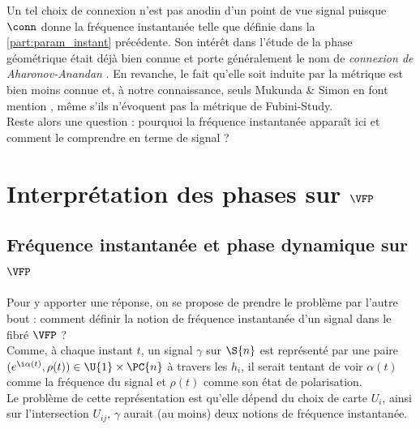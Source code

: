 Un tel choix de connexion n'est pas anodin d'un point de vue signal puisque $\conn$ donne la fréquence instantanée telle que définie dans la \cref{part:param_instant} précédente.
Son intérêt dans l'étude de la phase géométrique était déjà bien connue et porte généralement le nom de \emph{connexion de Aharonov-Anandan} \cite[sec. 4.2]{bohm_geometric_2003}. En revanche, le fait qu'elle soit induite par la métrique est bien moins connue et, à notre connaissance, seuls Mukunda \& Simon en font mention \cite{mukunda_quantum_1993}, même s'ils n'évoquent pas la métrique de Fubini-Study.
\\
Reste alors une question : pourquoi la fréquence instantanée apparaît ici et comment le comprendre en terme de signal ?
\\




\section{Interprétation des phases sur $\bf{\VFP}$} \label{sec:phases_dans_VFP}



\subsection{Fréquence instantanée et phase dynamique sur $\bf{\VFP}$}
\label{subsec:phased-V_geodiff}

Pour y apporter une réponse, on se propose de prendre le problème par l'autre bout : comment définir la notion de fréquence instantanée d'un signal dans le fibré $\VFP$ ?
\\

Comme, à chaque instant $t$, un signal $\gamma$ sur $\S{n}$ est représenté par une paire $(e^{\i \alpha(t)}, \rho(t))\in\U{1}\times\PC{n}$ à travers les $h_i$,  il serait tentant de voir $\alpha(t)$ comme la fréquence du signal et $\rho(t)$ comme son état de polarisation.
\\
Le problème de cette représentation est qu'elle dépend du choix de carte $U_i$, ainsi sur l'intersection $U_{ij}$, $\gamma$ aurait (au moins) deux notions de fréquence instantanée.
\\


